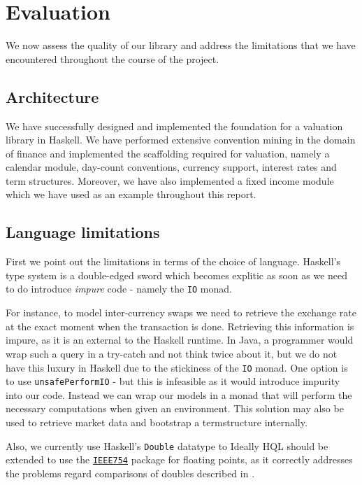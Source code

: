 \chapter{Evaluation}

We now assess the quality of our library and address the limitations that we
have encountered throughout the course of the project.

\section{Architecture}

We have successfully designed and implemented the foundation for a valuation 
library in Haskell. We have performed extensive convention mining in the domain
of finance and implemented the scaffolding required for valuation, 
namely a calendar module, day-count conventions, currency support, interest 
rates and term structures. Moreover, we have also implemented a fixed income 
module which we have used as an example throughout this report.

\section{Language limitations}

First we point out the limitations in terms of the choice of language.
Haskell's type system is a double-edged sword which becomes explitic as soon 
as we need to do introduce \emph{impure} code - namely the \texttt{IO} monad.

For instance, to model inter-currency swaps we need to retrieve the exchange 
rate at the exact moment when the transaction is done. Retrieving this 
information is impure, as it is an external to the Haskell runtime. In Java, a 
programmer would wrap such a query in a try-catch and not think twice about it, 
but we do not have this luxury in Haskell due to the stickiness of the 
\texttt{IO} monad. One option is to use \texttt{unsafePerformIO} - but this is 
infeasible as it would introduce impurity into our code.
Instead we can wrap our models in a monad that will perform the necessary 
computations when given an environment. This solution may also be used to 
retrieve market data and bootstrap a termstructure internally.

Also, we currently use Haskell's \texttt{Double} datatype to 
Ideally HQL should be extended to use the \href{https://hackage.haskell.org/package/data-binary-ieee754}{\texttt{IEEE754}} package for floating 
points, as it correctly addresses the problems regard comparisons of 
doubles described in \cite{blogpost}.


